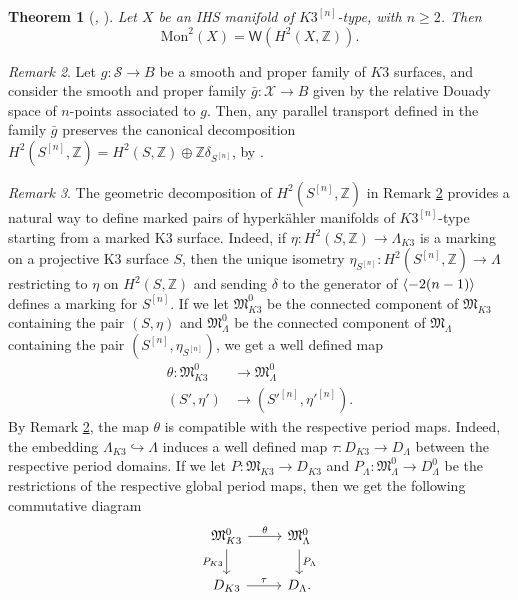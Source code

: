 \documentclass[12pt,a4paper]{amsart}
\theoremstyle{plain}
\newtheorem{thm}{Theorem}[section]
\theoremstyle{definition}
\theoremstyle{remark}
\newtheorem{rmk}[thm]{Remark}
\def\Z{\mathbb{Z}}
\def\H{H}
\newcommand{\mon}{\mathrm{Mon}}
\newcommand{\W}{\mathsf{W}}
\newcommand{\Lambdan}{{\Lambda}}
\newcommand{\nn}{{[n]}}
\DeclarePairedDelimiter{\brak}{\langle}{\rangle}
\begin{document}
\begin{thm}[\textit{\cite[Corollary 1.8]{Mar08}, \cite[Theorem 2.2]{Mar10}}]\label{markman_monodromy} Let $X$ be an IHS manifold of $K3^{[n]}$-type, with $n\geq 2$. Then $$\mon^2(X)=\W(\H^2(X,\Z)).$$
\end{thm}

\begin{rmk}\label{rmkbeauville}
    Let $g\colon \mathcal{S}\rightarrow B$ be a smooth and proper family of $K3$ surfaces, and consider the smooth and proper family $\bar{g}\colon \mathcal{X}\rightarrow B$ given by the relative Douady space of $n$-points associated to $g$. Then, any parallel transport defined in the family $\bar{g}$ preserves the canonical decomposition $\H^2(S^{[n]},\mathbb{Z})=\H^2(S,\mathbb{Z})\oplus\mathbb{Z}\delta_{S^{[n]}}$, by \cite[Section 9, Lemme 2]{Bea83}.
\end{rmk}

\begin{rmk}
    The geometric decomposition of $H^2(S^\nn,\Z)$ in Remark \ref{rmkbeauville} provides a natural way to define marked pairs of hyperkähler manifolds of $K3^{[n]}$-type starting from a marked K3 surface. Indeed, if $\eta\colon \H^2(S,\Z)\to \Lambda_{K3}$ is a marking on a projective K3 surface $S$, then the unique isometry $\eta_{S^{[n]}}\colon \H^2(S^{[n]},\Z)\to \Lambdan$ restricting to $\eta$ on $\H^2(S,\Z)$ and sending $\delta$ to the generator of $\brak{-2(n-1)}$ defines a marking for $S^{[n]}$. If we let $\mathfrak{M}_{K3}^0$ be the connected component of $\mathfrak{M}_{K3}$ containing the pair $(S,\eta)$ and $\mathfrak{M}_\Lambdan^0$ be the connected component of $\mathfrak{M}_\Lambdan$ containing the pair $(S^{[n]},\eta_{S^{[n]}})$, we get a well defined map \begin{align*}
        \theta \colon \mathfrak{M}_{K3}^0&\to \mathfrak{M}_\Lambdan^0\\
        (S',\eta') & \to (S'^{[n]},\eta'^{[n]}).
    \end{align*} By Remark \ref{rmkbeauville}, the map $\theta$ is compatible with the respective period maps. Indeed, the embedding $\Lambda_{K3}\hookrightarrow \Lambdan$ induces a well defined map $\tau\colon D_{K3}\to D_\Lambdan$ between the respective period domains. If we let $P\colon \mathfrak{M}_{K3} \to D_{K3}$ and $P_\Lambdan\colon \mathfrak{M}_{\Lambdan}^0\to D_\Lambdan^0$ be the restrictions of the respective global period maps, then we get the following commutative diagram \begin{equation}\label{diag_markedK3tomarkedk3n}
\begin{tikzcd}
	{\mathfrak{M}_{K3}^0} & {\mathfrak{M}_{\Lambdan}^0} \\
	{D_{K3}} & {D_\Lambdan}
	\arrow["\theta", from=1-1, to=1-2]
	\arrow["{P_{K3}}"', from=1-1, to=2-1]
	\arrow["P_\Lambdan", from=1-2, to=2-2]
	\arrow["\tau", from=2-1, to=2-2].
\end{tikzcd}
\end{equation}
\end{rmk}
    
\end{document}
